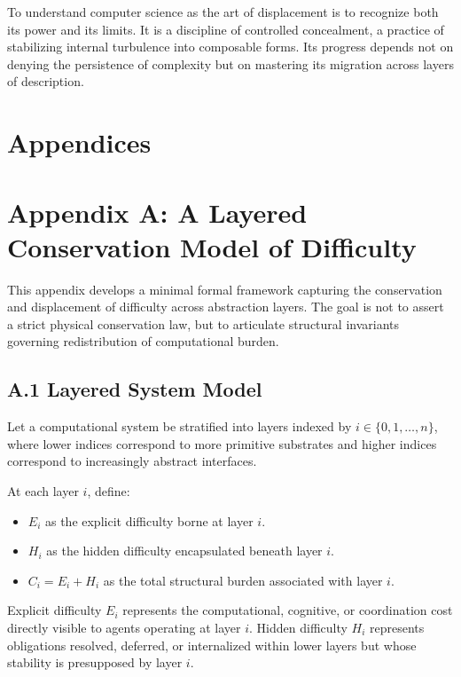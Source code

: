 \documentclass[11pt]{article}
\begin{document}
To understand computer science as the art of displacement is to recognize both its power and its limits. It is a discipline of controlled concealment, a practice of stabilizing internal turbulence into composable forms. Its progress depends not on denying the persistence of complexity but on mastering its migration across layers of description.

\newpage
\section*{Appendices} 

\appendix
\setcounter{secnumdepth}{0}

\section{Appendix A: A Layered Conservation Model of Difficulty}

This appendix develops a minimal formal framework capturing the conservation and displacement of difficulty across abstraction layers. The goal is not to assert a strict physical conservation law, but to articulate structural invariants governing redistribution of computational burden.

\subsection{A.1 Layered System Model}

Let a computational system be stratified into layers indexed by $i \in \{0,1,\dots,n\}$, where lower indices correspond to more primitive substrates and higher indices correspond to increasingly abstract interfaces. 

At each layer $i$, define:

\begin{itemize}
\item $E_i$ as the explicit difficulty borne at layer $i$.
\item $H_i$ as the hidden difficulty encapsulated beneath layer $i$.
\item $C_i = E_i + H_i$ as the total structural burden associated with layer $i$.
\end{itemize}

Explicit difficulty $E_i$ represents the computational, cognitive, or coordination cost directly visible to agents operating at layer $i$. Hidden difficulty $H_i$ represents obligations resolved, deferred, or internalized within lower layers but whose stability is presupposed by layer $i$.
\end{document}

